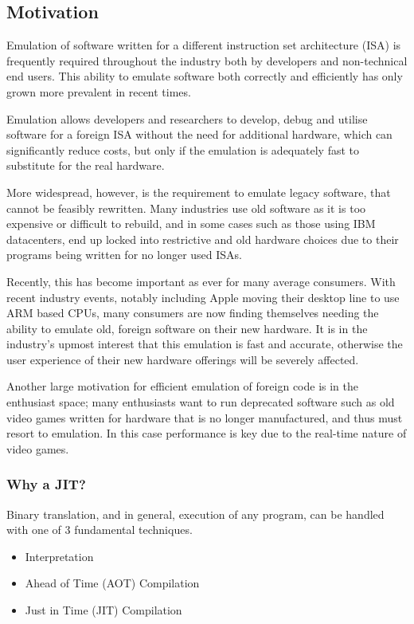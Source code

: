\subsection{Motivation}

Emulation of software written for a different instruction set architecture (ISA) is frequently required throughout the industry both by developers and non-technical end users. This ability to emulate software both correctly and efficiently has only grown more prevalent in recent times.

Emulation allows developers and researchers to develop, debug and utilise software for a foreign ISA without the need for additional hardware, which can significantly reduce costs, but only if the emulation is adequately fast to substitute for the real hardware.

More widespread, however, is the requirement to emulate legacy software, that cannot be feasibly rewritten. Many industries use old software as it is too expensive or difficult to rebuild, and in some cases such as those using IBM datacenters, end up locked into restrictive and old hardware choices due to their programs being written for no longer used ISAs.

Recently, this has become important as ever for many average consumers. With recent industry events, notably including Apple moving their desktop line to use ARM based CPUs, many consumers are now finding themselves needing the ability to emulate old, foreign software on their new hardware. It is in the industry's upmost interest that this emulation is fast and accurate, otherwise the user experience of their new hardware offerings will be severely affected.

Another large motivation for efficient emulation of foreign code is in the enthusiast space; many enthusiasts want to run deprecated software such as old video games written for hardware that is no longer manufactured, and thus must resort to emulation. In this case performance is key due to the real-time nature of video games.

\subsubsection{Why a JIT?}

Binary translation, and in general, execution of any program, can be handled with one of 3 fundamental techniques.

\begin{itemize}
    \item Interpretation
    \item Ahead of Time (AOT) Compilation
    \item Just in Time (JIT) Compilation
\end{itemize}

